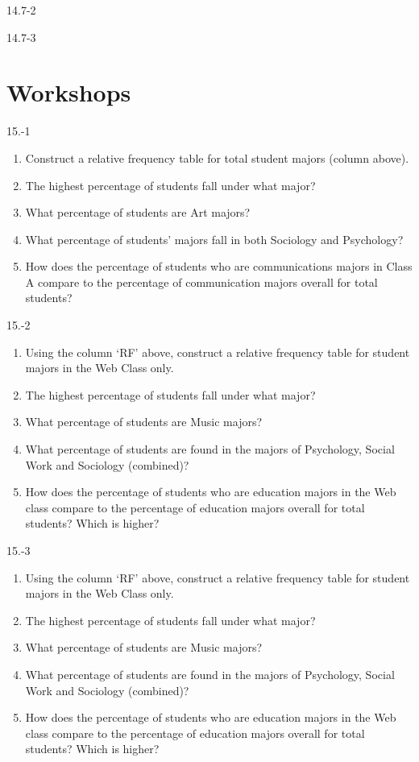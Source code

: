 \begin{exsol@solution}{14.7-2}
\end{exsol@solution}
\begin{exsol@solution}{14.7-3}

\end{exsol@solution}
\setcounter{chapter}{15}\chapter{Workshops}
\begin{exsol@solution}{15.-1}

  \begin{enumerate}
  \item Construct a relative frequency table for total student majors (column above).
  \item	The highest percentage of students fall under what major?
  \item	What percentage of students are Art majors?
  \item	What percentage of students’ majors fall in both Sociology and Psychology?
  \item	How does the percentage of students who are communications majors in Class A compare to the percentage of communication majors overall for total students?
\end{enumerate}
\end{exsol@solution}
\begin{exsol@solution}{15.-2}
  \begin{enumerate}
  \item	Using the column `RF' above, construct a relative frequency table for student majors in the Web Class only.
  \item	The highest percentage of students fall under what major?
  \item	What percentage of students are Music majors?
  \item	What percentage of students are found in the majors of Psychology, Social Work and Sociology (combined)?
  \item	How does the percentage of students who are education majors in the Web class compare to the percentage of education majors overall for total students?  Which is higher?
\end{enumerate}
\end{exsol@solution}
\begin{exsol@solution}{15.-3}
  \begin{enumerate}
  \item	Using the column `RF' above, construct a relative frequency table for student majors in the Web Class only.
  \item	The highest percentage of students fall under what major?
  \item	What percentage of students are Music majors?
  \item	What percentage of students are found in the majors of Psychology, Social Work and Sociology (combined)?
  \item	How does the percentage of students who are education majors in the Web class compare to the percentage of education majors overall for total students?  Which is higher?
\end{enumerate}
\end{exsol@solution}
